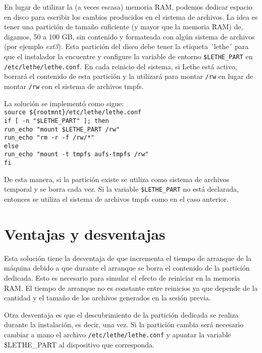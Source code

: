 \documentclass[final,narroweqnarray,inline,twoside]{ieee}
\begin{document}
En lugar de utilizar la (a veces escasa) memoria RAM, podemos dedicar espacio en disco para escribir los cambios producidos
en el sistema de archivos. La idea es tener una partición de tamaño suficiente (y mayor que la memoria RAM) de, digamos, 50 a
100 GB, sin contenido y formateada con algún sistema de archivos (por ejemplo \textit{ext3}). Esta partición del disco debe
tener la etiqueta ´lethe´ para que el instalador la encuentre y configure la variable de entorno \texttt{\$LETHE\_PART} en
\texttt{/etc/lethe/lethe.conf}. En cada reinicio del sistema, si Lethe está activo, borrará el contenido de esta partición y
la utilizará para montar \texttt{/rw} en lugar de montar \texttt{/rw} con el sistema de archivos tmpfs.

La solución se implementó como sigue:
\\\texttt{source \$\{rootmnt\}/etc/lethe/lethe.conf}
\\\texttt{if [ -n "\$LETHE\_PART" ]; then}
\\\texttt{\indent run\_echo "mount \$LETHE\_PART /rw"}
\\\texttt{\indent run\_echo "rm -r -f /rw/*"}
\\\texttt{else}
\\\texttt{\indent run\_echo "mount -t tmpfs aufs-tmpfs /rw"}
\\\texttt{fi}

De esta manera, si la partición existe se utiliza como sistema de archivos temporal y se borra cada vez. Si la variable
\texttt{\$LETHE\_PART} no está declarada, entonces se utiliza el sistema de archivos tmpfs como en el caso anterior.

\section{Ventajas y desventajas}
Esta solución tiene la desventaja de que incrementa el tiempo de arranque de la máquina debido a que durante el arranque se
borra el contenido de la partición dedicada. Esto es necesario para simular el efecto de reiniciar en la memoria RAM. El
tiempo de arranque no es constante entre reinicios ya que depende de la cantidad y el tamaño de los archivos generados en la
sesión previa. 

Otra desventaja es que el descubrimiento de la partición dedicada se realiza durante la instalación, es decir, una vez. Si la
partición cambia será necesario cambiar a mano el archivo \texttt{/etc/lethe/lethe.conf} y apuntar la variable \$LETHE\_PART
al dispositivo que corresponda.
\end{document}
